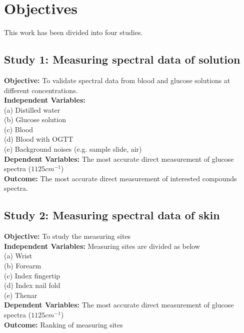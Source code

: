 \section{Objectives}

This work has been divided into four studies. 
\subsection{Study 1: Measuring spectral data of solution}
\textbf{Objective:} To validate spectral data from blood and glucose solutions at different concentrations.
\\
\textbf{Independent Variables:}
\\(a) Distilled water
\\(b) Glucose solution
\\(c) Blood 
\\(d) Blood with OGTT
\\(e) Background noises (e.g. sample slide, air)
\\
\textbf{Dependent Variables:} The most accurate direct measurement of glucose spectra ($1125cm^{-1}$)
\\
\textbf{Outcome:} The most accurate direct measurement of interested compounds spectra.

\subsection{Study 2: Measuring spectral data of skin}
\textbf{Objective:} To study the measuring sites
\\
\textbf{Independent Variables:} Measuring sites are divided as below
\\(a) Wrist
\\(b) Forearm
\\(c) Index fingertip
\\(d) Index nail fold
\\(e) Thenar
\\
\textbf{Dependent Variables:} The most accurate direct measurement of glucose spectra ($1125cm^{-1}$)
\\
\textbf{Outcome:} Ranking of measuring sites

